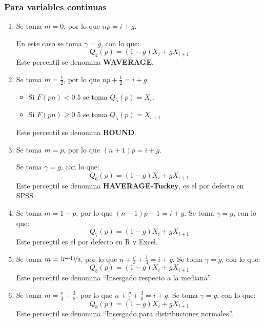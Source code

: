 \subsubsection{Para variables continuas}
\begin{enumerate}
    \item[4.] Se toma $m=0$, por lo que $np = i+g$.

        En este caso se toma $\gamma=g$, con lo que:
        \begin{equation*}
            Q_4(p) = (1-g)X_i + gX_{i+1}
        \end{equation*}
        Este percentil se denomina \textbf{WAVERAGE}.
    \item[5.] Se toma $m=\frac{1}{2}$, por lo que $np + \frac{1}{2}=i + g$.
        \begin{itemize}
            \item Si $F(pn) < 0.5$ se toma $Q_5(p) = X_i$.
            \item Si $F(pn) \geq 0.5$ se toma $Q_5(p) = X_{i+1}$
        \end{itemize}
        Este percentil se denomina \textbf{ROUND}.
    \item[6.] Se toma $m=p$, por lo que $(n+1)p = i + g$.

        Se toma $\gamma = g$, con lo que:
        \begin{equation*}
            Q_6(p) = (1-g)X_i + gX_{i+1}
        \end{equation*}
        Este percentil se denomina \textbf{HAVERAGE-Tuckey}, es el por defecto en SPSS.
    \item[7.] Se  toma $m=1-p$, por lo que $(n-1)p+1 = i + g$.
        Se toma $\gamma = g$, con lo que:
        \begin{equation*}
            Q_7(p) = (1-g)X_i + gX_{i+1}
        \end{equation*}
        Este percentil es el por defecto en R y Excel.
    \item[8.] Se toma $m=\nicefrac{(p+1)}{3}$, por lo que $n+\frac{p}{3}+\frac{1}{3}=i+g$.
        Se toma $\gamma = g$, con lo que:
        \begin{equation*}
            Q_8(p) = (1-g)X_i + gX_{i+1}
        \end{equation*}
        Este percentil se denomina ``Insesgado respecto a la mediana''.
    \item [9.] Se toma $m=\frac{p}{4}+\frac{3}{8}$, por lo que $n+\frac{p}{4}+\frac{3}{8}=i+g$.
        Se toma $\gamma = g$, con lo que:
        \begin{equation*}
            Q_8(p) = (1-g)X_i + gX_{i+1}
        \end{equation*}
        Este percentil se denomina ``Insesgado para distribuciones normales''.
\end{enumerate}

